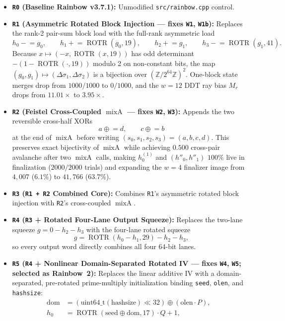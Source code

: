 \documentclass[10pt]{article}
\theoremstyle{definition}
\newcommand{\W}{\mathbb{Z}/2^{64}\mathbb{Z}}
\newcommand{\ROTR}{\operatorname{ROTR}}
\newcommand{\mixA}{\operatorname{mixA}}
\newcommand{\code}[1]{\texttt{#1}}
\begin{document}
\begin{itemize}
  \item \textbf{\code{R0} (Baseline Rainbow v3.7.1):} Unmodified \code{src/rainbow.cpp} control.
  \item \textbf{\code{R1} (Asymmetric Rotated Block Injection --- fixes \code{W1}, \code{W1b}):} Replaces the rank-2 pair-sum block load with the full-rank asymmetric load
  \[
    h_0 \mathrel{-}= g_0,\qquad h_1 \mathrel{+}= \ROTR(g_0, 19),\qquad h_2 \mathrel{+}= g_1,\qquad h_3 \mathrel{-}= \ROTR(g_1, 41).
  \]
  Because $x \mapsto (-x, \ROTR(x, 19))$ has odd determinant $-(1 - \ROTR(\cdot, 19))$ modulo 2 on non-constant bits, the map $(g_0, g_1) \mapsto (\Delta\sigma_1, \Delta\sigma_2)$ is a bijection over $(\W)^2$. One-block state merges drop from $1000/1000$ to $0/1000$, and the $w=12$ DDT ray bias $M_r$ drops from $11.01\times$ to $3.95\times$.
  \item \textbf{\code{R2} (Feistel Cross-Coupled $\mixA$ --- fixes \code{W2}, \code{W3}):} Appends the two reversible cross-half XORs
  \[
    a \mathrel{\oplus}= d,\qquad c \mathrel{\oplus}= b
  \]
  at the end of $\mixA$ before writing $(s_0, s_1, s_2, s_3) = (a, b, c, d)$. This preserves exact bijectivity of $\mixA$ while achieving $0.500$ cross-pair avalanche after two $\mixA$ calls, making $h^{(1)}_0$ and $(h''_0, h''_1)$ $100\%$ live in finalization ($2000/2000$ trials) and expanding the $w=4$ finalizer image from $4{,}007$ ($6.1\%$) to $41{,}766$ ($63.7\%$).
  \item \textbf{\code{R3} (\code{R1 + R2} Combined Core):} Combines \code{R1}'s asymmetric rotated block injection with \code{R2}'s cross-coupled $\mixA$.
  \item \textbf{\code{R4} (\code{R3} + Rotated Four-Lane Output Squeeze):} Replaces the two-lane squeeze $g = 0 - h_2 - h_3$ with the four-lane rotated squeeze
  \[
    g = \ROTR(h_0 - h_1, 29) - h_2 - h_3,
  \]
  so every output word directly combines all four 64-bit lanes.
  \item \textbf{\code{R5} (\code{R4} + Nonlinear Domain-Separated Rotated IV --- fixes \code{W4}, \code{W5}; selected as \textbf{Rainbow~2}):} Replaces the linear additive IV with a domain-separated, pre-rotated prime-multiply initialization binding \code{seed}, \code{olen}, and \code{hashsize}:
  \begin{align*}
    \mathrm{dom} &= (\mathrm{uint64\_t}(\mathrm{hashsize}) \ll 32) \oplus (\mathrm{olen} \cdot P), \\
    h_0 &= \ROTR(\mathrm{seed} \oplus \mathrm{dom}, 17) \cdot Q + 1, &

\end{align*}
\end{itemize}
\end{document}

